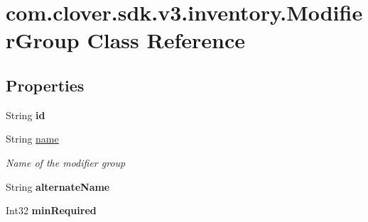 \hypertarget{classcom_1_1clover_1_1sdk_1_1v3_1_1inventory_1_1_modifier_group}{}\section{com.\+clover.\+sdk.\+v3.\+inventory.\+Modifier\+Group Class Reference}
\label{classcom_1_1clover_1_1sdk_1_1v3_1_1inventory_1_1_modifier_group}
\subsection*{Properties}
\begin{DoxyCompactItemize}
\item 
\mbox{\label{classcom_1_1clover_1_1sdk_1_1v3_1_1inventory_1_1_modifier_group_a8a7f7fc204c50613d257bb577106ab3b}} 
String {\bfseries id}
\item 
String \hyperlink{classcom_1_1clover_1_1sdk_1_1v3_1_1inventory_1_1_modifier_group_ac8ccb2e4d8bc23bbd6d8fd2336951c26}{name}
\begin{DoxyCompactList}\small\item\em Name of the modifier group \end{DoxyCompactList}\item 
\mbox{\label{classcom_1_1clover_1_1sdk_1_1v3_1_1inventory_1_1_modifier_group_aba0d799002ca5989e4e3f2e399ed2ac0}} 
String {\bfseries alternate\+Name}
\item 
\mbox{\label{classcom_1_1clover_1_1sdk_1_1v3_1_1inventory_1_1_modifier_group_a507c73165be4e9eb29ee09b0e37a5605}} 
Int32 {\bfseries min\+Required}
\item 
\mbox{\label{classcom_1_1clover_1_1sdk_1_1v3_1_1inventory_1_1_modifier_group_a4ad730845803384fceda210b78355e78}} 

\end{DoxyCompactItemize}
